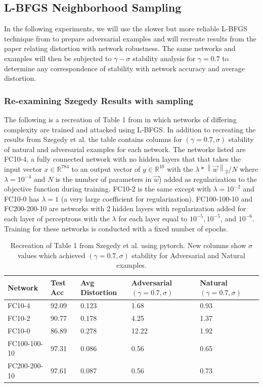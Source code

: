 \documentclass[10pt]{extarticle}
\newcommand{\R}{\mathbb{R}}
\newcommand{\Norm}[1]{\left\lVert #1 \right\rVert}
\newcounter{col}
\begin{document}
\subsection{L-BFGS Neighborhood Sampling}

In the following experiments, we will use the slower but more reliable L-BFGS technique from \cite{Szegedy2013} to prepare adversarial examples and will recreate results from the paper relating distortion with network robustness. The same networks and examples will then be subjected to $\gamma-\sigma$ stability analysis for $\gamma = 0.7$ to determine any correspondence of stability with network accuracy and average distortion. 

\subsubsection{Re-examining Szegedy Results with sampling}

The following is a recreation of Table 1 from \cite{Szegedy2013} in which networks of differing complexity are trained and attacked using L-BFGS. In addition to recreating the results from Szegedy et al. the table contains columns for $(\gamma=0.7, \sigma)$ stability of natural and adversarial examples for each network. The networks listed are FC10-4, a fully connected network with no hidden layers that that takes the input vector $x \in \R^{784}$ to an output vector of $y \in \R^{10}$ with the $\lambda*\Norm{\vec w}_2/N$ where $\lambda = 10^{-4}$ and $N$ is the number of parameters in $\vec w$) added as regularization to the objective function during training. FC10-2 is the same except with $\lambda = 10^{-2}$ and FC10-0 has $\lambda=1$ (a very large coefficient for regularization). FC100-100-10 and FC200-200-10 are networks with 2 hidden layers with regularization added for each layer of perceptrons with the $\lambda$ for each layer equal to $10^{-5}, 10^{-5}$, and  $10^{-6}$. Training for these networks is conducted with a fixed number of epochs. 

\begin{table}[H]

\begin{tabular}{|l|l|l|l|l|}
\hline
Network & Test Acc & Avg Distortion & Adversarial $(\gamma=0.7, \sigma)$ & Natural $(\gamma=0.7, \sigma)$ \\\hline
FC10-4 & 92.09 & 0.123 & 1.68 & 0.93\\
FC10-2 & 90.77 & 0.178 & 4.25 & 1.37\\
FC10-0 & 86.89 & 0.278 & 12.22 & 1.92\\
FC100-100-10 & 97.31 & 0.086 & 0.56 & 0.65\\
FC200-200-10 & 97.61 & 0.087 & 0.56 & 0.73\\\hline
\end{tabular}
\caption{Recreation of Table 1 from Szegedy et al. using pytorch. New columns show $\sigma$ values which achieved $(\gamma=0.7,\sigma)$ stability for Adversarial and Natural examples. }
\label{table1}
\end{table}
\end{document}
